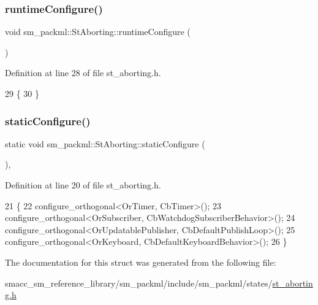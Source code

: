 \subsubsection{\texorpdfstring{runtime\+Configure()}{runtimeConfigure()}}
{\footnotesize\ttfamily void sm\+\_\+packml\+::\+St\+Aborting\+::runtime\+Configure (\begin{DoxyParamCaption}{ }\end{DoxyParamCaption})\hspace{0.3cm}{\ttfamily [inline]}}



Definition at line 28 of file st\+\_\+aborting.\+h.


\begin{DoxyCode}
29     \{
30     \}
\end{DoxyCode}
\mbox{\label{structsm__packml_1_1StAborting_a221bf7399be134b4d0fd498327613e70}} 
\subsubsection{\texorpdfstring{static\+Configure()}{staticConfigure()}}
{\footnotesize\ttfamily static void sm\+\_\+packml\+::\+St\+Aborting\+::static\+Configure (\begin{DoxyParamCaption}{ }\end{DoxyParamCaption})\hspace{0.3cm}{\ttfamily [inline]}, {\ttfamily [static]}}



Definition at line 20 of file st\+\_\+aborting.\+h.


\begin{DoxyCode}
21     \{
22         configure\_orthogonal<OrTimer, CbTimer>();   
23         configure\_orthogonal<OrSubscriber, CbWatchdogSubscriberBehavior>();
24         configure\_orthogonal<OrUpdatablePublisher, CbDefaultPublishLoop>();
25         configure\_orthogonal<OrKeyboard, CbDefaultKeyboardBehavior>();
26     \}
\end{DoxyCode}


The documentation for this struct was generated from the following file\+:\begin{DoxyCompactItemize}
\item 
smacc\+\_\+sm\+\_\+reference\+\_\+library/sm\+\_\+packml/include/sm\+\_\+packml/states/\hyperlink{st__aborting_8h}{st\+\_\+aborting.\+h}\end{DoxyCompactItemize}
